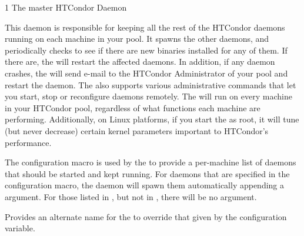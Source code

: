 \begin{ManPage}{\label{man-condor-master}}{1}
{The master HTCondor Daemon}

\Synopsis {}

\Description 

This daemon is responsible for keeping all the
rest of the HTCondor daemons running on each machine in your pool.  It  
spawns the other daemons, and periodically checks to see if there are
new binaries installed for any of them.  If there are,
the  will restart the affected daemons.
In addition, if any daemon crashes, the
 will send e-mail to the HTCondor Administrator of your pool and 
restart the daemon.  The  also supports various
administrative commands that let you start, stop or reconfigure
daemons remotely.  The  will run on every machine in 
your HTCondor pool, regardless of what functions each machine are
performing.  Additionally, on Linux platforms, if you start the
 as root, it will tune (but never decrease) certain
kernel parameters important to HTCondor's performance.


The  configuration macro is used by the
 to provide a per-machine list of daemons that
should be started and kept running.
For daemons that are specified in the 
configuration macro,
the  daemon will spawn them automatically
appending a  argument.
For those listed in , but not in ,
there will be no  argument.

\begin{Options}
            {Provides an alternate name for the 
            to override that given by the 
	    configuration variable.
            }
\end{Options}

\end{ManPage}
